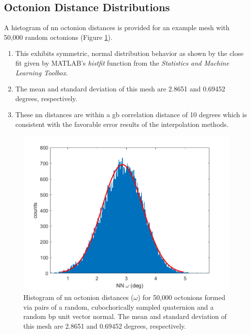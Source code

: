 \documentclass[preprint,12pt]{elsarticle}
\begin{document}
\subsection{Octonion Distance Distributions} \label{sec:results:dist}
\item A histogram of \gls{nn} octonion distances is provided for an example mesh with 50,000 random octonions (Figure \ref{fig:nndist}).
\begin{enumerate}
    \item This exhibits symmetric, normal distribution behavior as shown by the close fit given by MATLAB's \textit{histfit} function from the \textit{Statistics and Machine Learning Toolbox}.
    \item The mean and standard deviation of this mesh are 2.8651 and 0.69452 degrees, respectively.
    \item These \gls{nn} distances are within a \gls{gb} correlation distance of 10 degrees \cite{rohrerComparingCalculatedMeasured2010} which is consistent with the favorable error results of the interpolation methods.
\end{enumerate}

\begin{figure}
\centering
\includegraphics{disthist50000.png}
\caption{Histogram of \acrfull{nn} octonion distances ($\omega$) for 50,000 octonions formed via pairs of a random, cubochorically sampled quaternion and a random \acrfull{bp} unit vector normal. The mean and standard deviation of this mesh are 2.8651 and 0.69452 degrees, respectively.}
\label{fig:nndist}
\end{figure}
\end{document}
